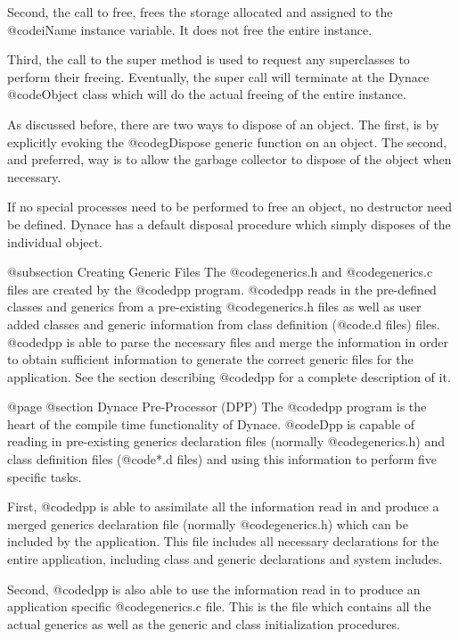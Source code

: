 Second, the call to free, frees the storage allocated and assigned to
the @code{iName} instance variable.  It does not free the entire
instance.

Third, the call to the super method is used to request any
superclasses to perform their freeing.  Eventually, the super call will
terminate at the Dynace @code{Object} class which will do the actual
freeing of the entire instance.

As discussed before, there are two ways to dispose of an object.  The
first, is by explicitly evoking the @code{gDispose} generic function on
an object.  The second, and preferred, way is to allow the garbage
collector to dispose of the object when necessary.

If no special processes need to be performed to free an object, no
destructor need be defined.  Dynace has a default disposal procedure
which simply disposes of the individual object.


@subsection Creating Generic Files
The @code{generics.h} and @code{generics.c} files are created by the
@code{dpp} program.  @code{dpp} reads in the pre-defined classes and
generics from a pre-existing @code{generics.h} files as well as user
added classes and generic information from class definition (@code{.d}
files) files.  @code{dpp} is able to parse the necessary files and merge
the information in order to obtain sufficient information to generate
the correct generic files for the application.   See the section describing
@code{dpp} for a complete description of it.


@page
@section Dynace Pre-Processor (DPP)
The @code{dpp} program is the heart of the compile time functionality of
Dynace.  @code{Dpp} is capable of reading in pre-existing generics
declaration files (normally @code{generics.h}) and class
definition files (@code{*.d} files) and using this information to
perform five specific tasks.

First, @code{dpp} is able to assimilate all the information read
in and produce a merged generics declaration file (normally
@code{generics.h}) which can be included by the application.
This file includes all necessary declarations for the entire application,
including class and generic declarations and system includes.

Second, @code{dpp} is also able to use the information read in
to produce an application specific @code{generics.c} file.
This is the file which contains all the actual generics as well
as the generic and class initialization procedures.

